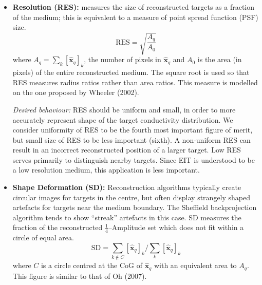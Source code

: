 \documentclass[12pt]{iopart}
\newcommand{\xH}{\mbox{$\mathbf{\hat x}$}}
\begin{document}
\begin{itemize}
\hspace{5mm}
{\em Desired behaviour:}
PE should be small and show small variability for
targets at different radial positions. We consider
small and constant PE to be the second most important
figure of merit. If PE is variable, interpretation
of a distribution of air in the lungs becomes unreliable.
Sheffield backprojection has large PE near the
electrodes, and this has resulted in cases where changes at
the electrodes are misinterpreted as being inside the body.

\item
{\bf Resolution (RES):}
measures the size of reconstructed targets as a fraction
of the medium; this is
equivalent to a measure of point spread function (PSF) size.
\begin{equation}
\mathrm{RES} = \sqrt{
 \frac{ A_q }
      { A_0 }
 }
\end{equation}
where $A_q =  \sum_k [\xH_q]_k$, the number
of pixels in $\xH_q$ and 
$A_0$ is the area (in pixels) of
the entire reconstructed medium. The square root is used 
so that RES measures radius ratios rather than area ratios.
This measure is modelled on the one proposed by
Wheeler \etal (2002).

\hspace{5mm}
{\em Desired behaviour:}
RES should be uniform and small, in order to 
more accurately represent shape of the target conductivity
distribution. We consider uniformity of RES to be the
fourth most important figure of merit, but small size
of RES to be less important (sixth). A non-uniform
RES can result in an incorrect reconstructed 
position of a larger target. Low RES serves primarily
to distinguish nearby targets. Since EIT is understood to
be a low resolution medium, this application is less important.

\item
{\bf Shape Deformation (SD):}
Reconstruction algorithms typically create circular
images for targets in the centre, but often display 
strangely shaped artefacts for targets near the medium
boundary. The Sheffield backprojection algorithm
 tends to show ``streak'' artefacts in this case.
SD measures the fraction of the reconstructed
$\frac{1}{4}$--Amplitude set which does not
fit within a circle of equal area.
\begin{equation}
\mathrm{SD} = \sum_{k\not\in C} [\xH_q]_k / 
              \sum_{k} [\xH_q]_k
\end{equation}
where $C$ is a circle centred at the CoG of $\xH_q$
with an equivalent area to $A_q$. This figure
is similar to that of Oh \etal (2007).


\end{itemize}
\end{document}
